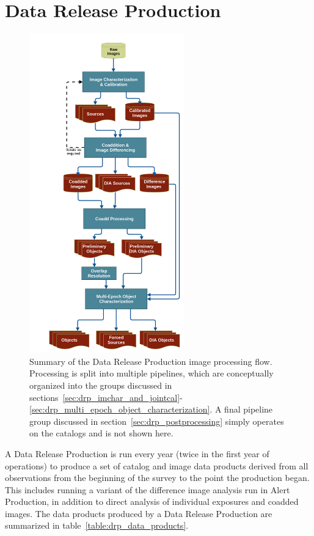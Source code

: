 \section{Data Release Production}
\label{sec:drp}

\begin{figure}
\centering
\includegraphics[width=0.6\textwidth]{figures/drp_summary.png}
\caption{Summary of the Data Release Production image processing flow.  Processing is split into multiple pipelines, which are conceptually organized into the groups discussed in sections~\ref{sec:drp_imchar_and_jointcal}-\ref{sec:drp_multi_epoch_object_characterization}.  A final pipeline group discussed in section~\ref{sec:drp_postprocessing} simply operates on the catalogs and is not shown here.
\label{fig:drp_summary}}
\end{figure}

A Data Release Production is run every year (twice in the first year of operations) to produce a set of catalog and image data products derived from all observations from the beginning of the survey to the point the production began.  This includes running a variant of the difference image analysis run in Alert Production, in addition to direct analysis of individual exposures and coadded images.  The data products produced by a Data Release Production are summarized in table~\ref{table:drp_data_products}.


